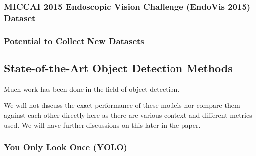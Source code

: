 \subsubsection{MICCAI 2015 Endoscopic Vision Challenge (EndoVis 2015) Dataset}


\subsubsection{Potential to Collect New Datasets}


\subsection{State-of-the-Art Object Detection Methods}

Much work has been done in the field of object detection.

We will not discuss the exact performance of these models nor compare them against each other directly here as there are various context and different metrics used. We will have further discussions on this later in the paper.

\subsubsection{You Only Look Once (YOLO)}

